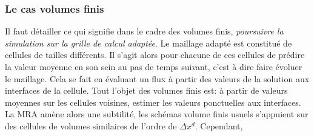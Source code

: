     \subsubsection{Le cas volumes finis}
            Il faut détailler ce qui signifie dans le cadre des volumes finis, \textit{poursuivre la simulation sur la grille de calcul adaptée}.
            Le maillage adapté est constitué de cellules de tailles différents.
            Il s'agit alors pour chacune de ces cellules de prédire la valeur moyenne en son sein au pas de temps suivant, c'est à dire faire évoluer le maillage.
            Cela se fait en évaluant un flux à partir des valeurs de la solution aux interfaces de la cellule. 
            Tout l'objet des volumes finis est: à partir de valeurs moyennes sur les cellules voisines, estimer les valeurs ponctuelles aux interfaces. 
            La MRA amène alors une subtilité, les schémas volume finis usuels s'appuient sur des cellules de volumes similaires de l'ordre de $\Delta x^d$.
            Cependant, 
